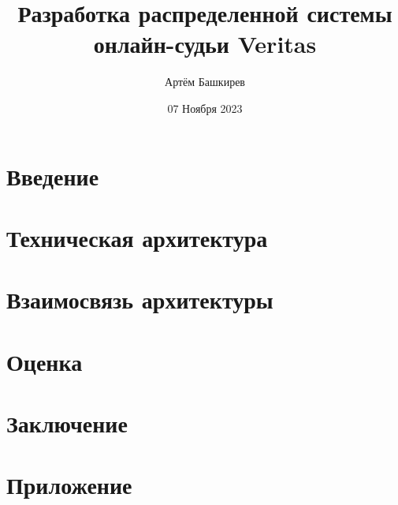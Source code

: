 \documentclass[12pt]{article}
\title{Разработка распределенной системы онлайн-судьи Veritas}
\author{Артём Башкирев}
\date{07 Ноября 2023}
\begin{document}
\maketitle
\thispagestyle{empty}

\newpage
    \tableofcontents
\newpage


    \section{Введение}
    
\newpage

    \section{Техническая архитектура}
    
\newpage

    \section{Взаимосвязь архитектуры}
    
\newpage

    \section{Оценка}
    
\newpage

    \section{Заключение}
    
    \thispagestyle{empty}
\newpage

    \section{Приложение}
    
    \thispagestyle{empty}
\end{document}
